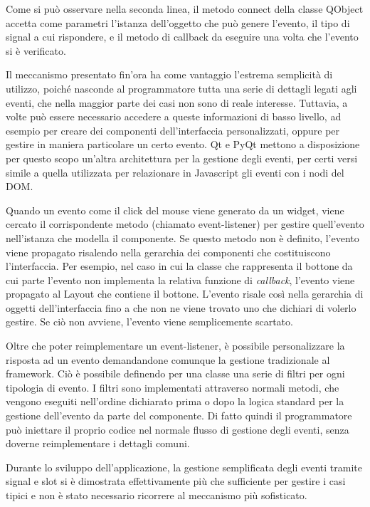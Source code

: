 \documentclass[12pt]{toptesi}
\begin{document}


Come si può osservare nella seconda linea, il metodo connect della classe QObject accetta come parametri l'istanza dell'oggetto che può genere l'evento, il tipo di signal a cui rispondere, e il metodo di callback da eseguire una volta che l'evento si è verificato.

Il meccanismo presentato fin'ora ha come vantaggio l'estrema semplicità di utilizzo, poiché nasconde al programmatore tutta una serie di dettagli legati agli eventi, che nella maggior parte dei casi non sono di reale interesse. Tuttavia, a volte può essere necessario accedere a queste informazioni di basso livello, ad esempio per creare dei componenti dell'interfaccia personalizzati, oppure per gestire in maniera particolare un certo evento. Qt e PyQt mettono a disposizione per questo scopo un'altra architettura per la gestione degli eventi, per certi versi simile a quella utilizzata per relazionare in Javascript gli eventi con i nodi del DOM. 

Quando un evento come il click del mouse viene generato da un widget, viene cercato il corrispondente metodo (chiamato event-listener) per gestire quell'evento nell'istanza che modella il componente. Se questo metodo non è definito, l'evento viene propagato risalendo nella gerarchia dei componenti che costituiscono l'interfaccia. Per esempio, nel caso in cui la classe che rappresenta il bottone da cui parte l'evento non implementa la relativa funzione di \emph{callback}, l'evento viene propagato al Layout che contiene il bottone. L'evento risale così nella gerarchia di oggetti dell'interfaccia fino a che non ne viene trovato uno che dichiari di volerlo gestire. Se ciò non avviene, l'evento viene semplicemente scartato. 

Oltre che poter reimplementare un event-listener, è possibile personalizzare la risposta ad un evento demandandone comunque la gestione tradizionale al framework. Ciò è possibile definendo per una classe una serie di filtri per ogni tipologia di evento. I filtri sono implementati attraverso normali metodi, che vengono eseguiti nell'ordine dichiarato prima o dopo la logica standard per la gestione dell'evento da parte del componente. Di fatto quindi il programmatore può iniettare il proprio codice nel normale flusso di gestione degli eventi, senza doverne reimplementare i dettagli comuni.

Durante lo sviluppo dell'applicazione, la gestione semplificata degli eventi tramite signal e slot si è dimostrata effettivamente più che sufficiente per gestire i casi tipici e non è stato necessario ricorrere al meccanismo più sofisticato.
\end{document}
